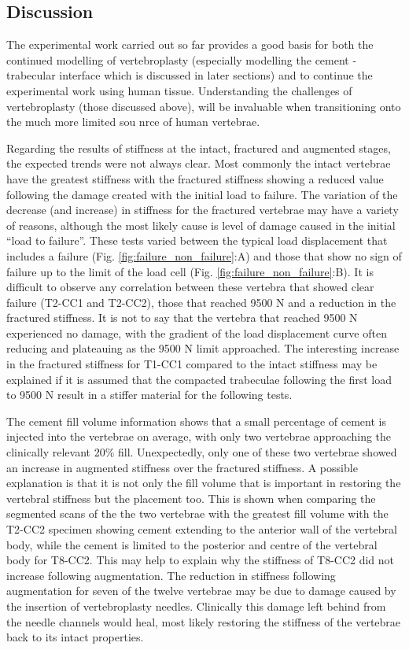 \subsection{Discussion}\label{discussion-bov}

The experimental work carried out so far provides a good basis for both the continued modelling of vertebroplasty (especially modelling the cement - trabecular interface which is discussed in later sections) and to continue the experimental work using human tissue. Understanding the challenges of vertebroplasty (those discussed above), will be invaluable when transitioning onto the much more limited sou nrce of human vertebrae.


Regarding the results of stiffness at the intact, fractured and augmented stages, the expected trends were not always clear. Most commonly the intact vertebrae have the greatest stiffness with the fractured stiffness showing a reduced value following the damage created with the initial load to failure. The variation of the decrease (and increase) in stiffness for the fractured vertebrae may have a variety of reasons, although the most likely cause is level of damage caused in the initial ``load
to failure''. These tests varied between the typical load displacement that includes a failure (Fig. \ref{fig:failure_non_failure}:A) and those that show no sign of failure up to the limit of the load cell (Fig. \ref{fig:failure_non_failure}:B). It is difficult to observe any correlation between these vertebra that showed clear failure (T2-CC1 and T2-CC2), those that reached 9500 N and a reduction in the fractured stiffness. It is not to say that the vertebra that reached 9500 N experienced no damage, with the gradient of the load displacement curve often reducing and plateauing as the 9500 N limit approached. The interesting increase in the fractured stiffness for T1-CC1 compared to the intact stiffness may be explained if it is assumed that the compacted trabeculae following the first load to 9500 N result in a stiffer material for the following tests.

The cement fill volume information shows that a small percentage of cement is injected into the vertebrae on average, with only two vertebrae approaching the clinically relevant 20\% fill. Unexpectedly, only one of these two vertebrae showed an increase in augmented stiffness over the fractured stiffness. A possible explanation is that it is not only the fill volume that is important in restoring the vertebral stiffness but the placement too. This is shown when comparing the segmented scans of the the two vertebrae with the greatest fill volume with the T2-CC2 specimen showing cement extending to the anterior wall of the vertebral body, while the cement is limited to the posterior and centre of the vertebral body for T8-CC2. This may help to explain why the stiffness of T8-CC2 did not increase following augmentation. The reduction in stiffness following augmentation for seven of the twelve vertebrae may be due to damage caused by the insertion of vertebroplasty needles. Clinically this damage left behind from the needle channels would heal, most likely restoring the stiffness of the vertebrae back to its intact properties.


